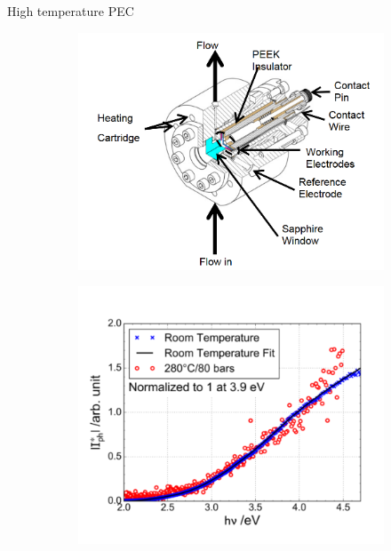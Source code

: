 \documentclass[10pt,compress,handout]{beamer}
\newcommand{\coef}{1}
\begin{document}
\begin{frame}[allowframebreaks=1.0]{High temperature PEC}
\begin{figure}[h]
            \label{fig_bojinov_ht}
        \end{figure}

        \renewcommand{\coef}{0.45}
        \begin{figure}[h]
            \centering
            \begin{subfigure}{\coef\textwidth}
                \centering
                \includegraphics[width=\textwidth]{./src/figures/skocic2015-1.png}
                \caption{}
                \label{fig_skocic_phd_cell}
            \end{subfigure}
            \begin{subfigure}{\coef\textwidth}
                \centering
                \includegraphics[width=\textwidth]{./src/figures/skocic2015-2.png}
                \caption{}
                \label{fig_skocic_phd_htpec}
            \end{subfigure}
            

\end{figure}
\end{frame}
\end{document}
